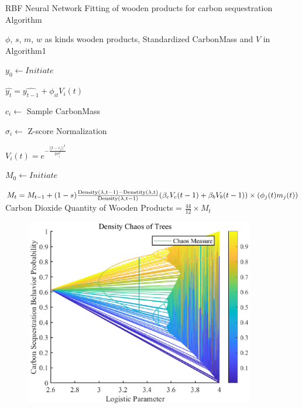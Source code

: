 \documentclass{mcmthesis}
\numberwithin{figure}{section}
\numberwithin{table}{section}
\numberwithin{equation}{section}
\begin{document}
  \begin{algorithm}[htbp]
    \caption{RBF Neural Network Fitting of wooden products for carbon sequestration Algorithm} \label{Product Algo}
    \begin{algorithmic}[1]
        \Require
            $ \phi $, $ s $, $ m $, $ w $ as kinds wooden products, Standardized CarbonMass and $ V $ in Algorithm1 

                $ y_0 \gets Initiate $ 

                $ \hat{y_t} = \hat{y_{t-1}} + \phi_{it}V_i(t) $
            
                $ c_i\gets $ Sample CarbonMass
            
                $ \sigma_i\gets $ Z-score Normalization

                $ V_i(t) = e^{-\frac{||t-c_i||^2}{2\sigma_i^2}} $
            \EndFor

            $ M_0\gets Initiate $ 


            $ M_t = M_{t-1}+(1-s)\frac{\rm{Density}(\lambda, t-1)-\rm{Denstity}(\lambda,t)
            }{\rm{Density}(\lambda, t-1)}(\beta_cV_c(t-1)+\beta_bV_b(t-1))\times (\phi_j(t)m_j(t)) $ 
            \EndFor
        \EndFor
        \Ensure
        Carbon Dioxide Quantity of Wooden Products = $ \frac{44}{12} \times M_t$ 
    \end{algorithmic}
\end{algorithm}

\begin{figure}[htbp]
  \centering
  \includegraphics[width = 10cm]{code&pic/Logistic.eps}
\end{figure}
\end{document}
